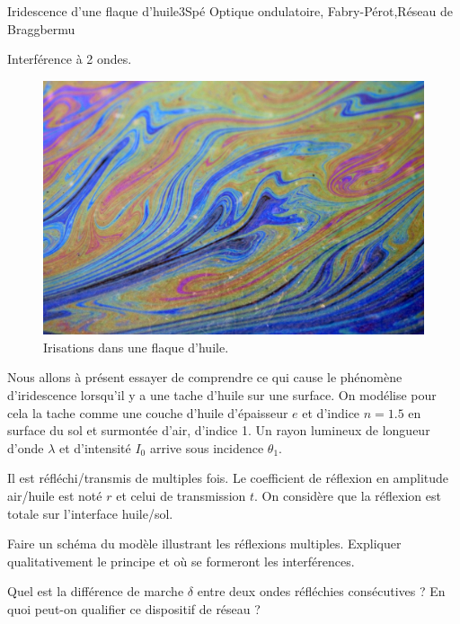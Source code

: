 
\begin{exercise}{Iridescence d'une flaque d'huile}{3}{Spé}
{Optique ondulatoire, Fabry-Pérot,Réseau de Bragg}{bermu}

\begin{questions}
\questioncours Interférence à 2 ondes.

\begin{EnvUplevel}
\begin{figure}[H]
    \centering
    \includegraphics[width=.8\linewidth]{optique/interferences/iridescence.png}
    \caption{Irisations dans une flaque d'huile.}
    \label{fig:my_label}
\end{figure}

Nous allons à présent essayer de comprendre ce qui cause le phénomène d'iridescence lorsqu'il y a une tache d'huile sur une surface. On modélise pour cela la tache comme une couche d'huile d'épaisseur $e$ et d'indice $n = 1.5$ en surface du sol et surmontée d'air, d'indice 1. Un rayon lumineux de longueur d'onde $\lambda$ et d'intensité $I_0$ arrive sous incidence $\theta_1$.

Il est réfléchi/transmis de multiples fois. Le coefficient de réflexion en amplitude air/huile est noté $r$ et celui de transmission $t$. On considère que la réflexion est totale sur l'interface huile/sol.
\end{EnvUplevel}

\question Faire un schéma du modèle illustrant les réflexions multiples. Expliquer qualitativement le principe et où se formeront les interférences.

\question Quel est la différence de marche $\delta$ entre deux ondes réfléchies consécutives ? En quoi peut-on qualifier ce dispositif de réseau ?


\end{questions}
\end{exercise}
